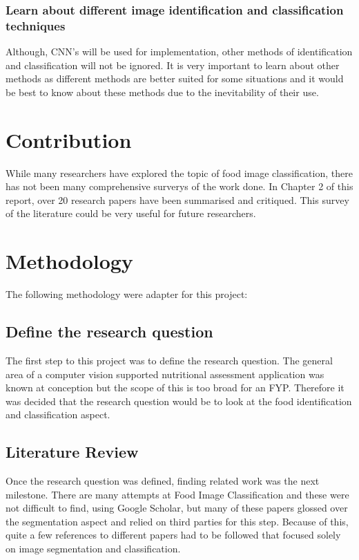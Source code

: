 \subsubsection*{Learn about different image identification and classification techniques}
Although, CNN's will be used for implementation, other methods of identification and classification will not be ignored.
It is very important to learn about other methods as different methods
are better suited for some situations and it would be best to know about these methods due to the inevitability of their use.

\section{Contribution}
While many researchers have explored the topic of food image classification, there has not been many comprehensive surverys of the work done.
In Chapter 2 of this report, over 20 research papers have been summarised and critiqued.
This survey of the literature could be very useful for future researchers. 

\section{Methodology}
The following methodology were adapter for this project:

\subsection*{Define the research question}
The first step to this project was to define the research question.
The general area of a computer vision supported nutritional assessment application was known at conception but the scope of this is too broad for an FYP.
Therefore it was decided that the research question would be to look at the food identification and classification aspect.

\subsection*{Literature Review}
Once the research question was defined, finding related work was the next milestone.
There are many attempts at Food Image Classification and these were not difficult to find, using Google Scholar, but many of these papers glossed over the segmentation aspect and relied on third parties for this step.
Because of this, quite a few references to different papers had to be followed that focused solely on image segmentation and classification.

